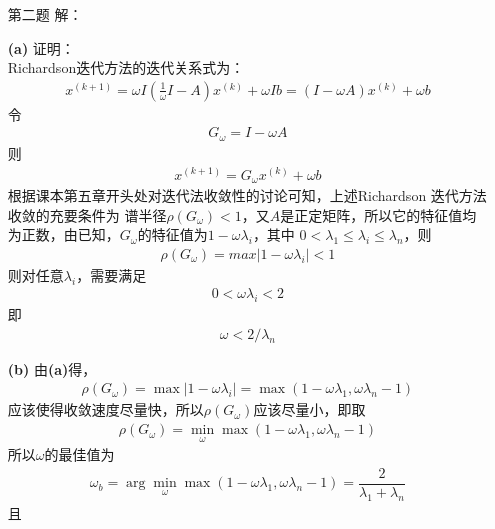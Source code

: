 \documentclass[12pt,a4paper,utf8]{ctexart}
\begin{document}
\begin{enumerate}
   \item[第二题] 解：
   \item[\textbf{(a)}] 证明：\\
         Richardson迭代方法的迭代关系式为：
         \begin{eqnarray}
            x^{(k+1)}=\omega I(\frac{1}{\omega}I-A)x^{(k)}+\omega Ib=(I-\omega A)x^{(k)}+\omega b
         \end{eqnarray}
         令
         \begin{eqnarray}
            G_\omega =I-\omega A
         \end{eqnarray}
         则
         \begin{eqnarray}
            x^{(k+1)}=G_\omega x^{(k)}+\omega b
         \end{eqnarray}
         根据课本第五章开头处对迭代法收敛性的讨论可知，上述Richardson 迭代方法收敛的充要条件为
         谱半径$\rho(G_\omega)<1$，又$A$是正定矩阵，所以它的特征值均为正数，由已知，$G_\omega$的特征值为$1-\omega \lambda_i$，其中
         $0<\lambda_1 \leq \lambda_i \leq \lambda_n$，则
         \begin{eqnarray}
            \rho(G_\omega)=max|1 − \omega \lambda_i|<1
         \end{eqnarray}
         则对任意$\lambda_i$，需要满足
         \begin{eqnarray}
            0<\omega \lambda_i<2
         \end{eqnarray}
         即
         \begin{eqnarray}
            \omega<2/\lambda_n
         \end{eqnarray}
   \item[\textbf{(b)}]
         由\textbf{(a)}得，
         \begin{eqnarray}
            \rho(G_\omega)=\max|1 − \omega \lambda_i| = \max(1 − \omega \lambda_1,\omega \lambda_n-1)
         \end{eqnarray}
         应该使得收敛速度尽量快，所以$\rho(G_\omega)$应该尽量小，即取
         \begin{eqnarray}
            \rho(G_\omega)=\min_\omega \max(1 − \omega \lambda_1,\omega \lambda_n-1)
         \end{eqnarray}
         所以$\omega$的最佳值为
         \begin{eqnarray}
            \omega_b = \arg \min_\omega \max(1 − \omega \lambda_1,\omega \lambda_n-1)=\dfrac{2}{\lambda_1+\lambda_n}
         \end{eqnarray}
         且
         \begin{eqnarray}

\end{eqnarray}
\end{enumerate}
\end{document}
